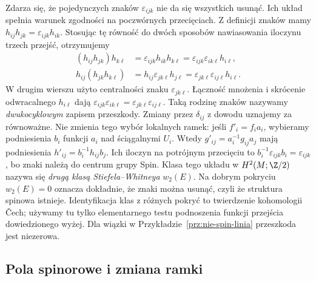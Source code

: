 \begin{uwaga}
Zdarza się, że pojedynczych znaków
$\varepsilon_{ijk}$ nie da się wszystkich
usunąć. Ich układ spełnia warunek zgodności
na poczwórnych przecięciach. Z definicji znaków mamy
$h_{ij}h_{jk}=\varepsilon_{ijk}h_{ik}$.
Stosując tę równość do dwóch sposobów nawiasowania
iloczynu trzech przejść, otrzymujemy
\[
 \begin{aligned}
 (h_{ij}h_{jk})h_{k\ell}
 &=\varepsilon_{ijk}h_{ik}h_{k\ell}
 =\varepsilon_{ijk}\varepsilon_{ik\ell}h_{i\ell},\\
 h_{ij}(h_{jk}h_{k\ell})
 &=h_{ij}\varepsilon_{jk\ell}h_{j\ell}
 =\varepsilon_{jk\ell}\varepsilon_{ij\ell}h_{i\ell}.
 \end{aligned}
\]
W drugim wierszu użyto centralności znaku $\varepsilon_{jk\ell}$.
Łączność mnożenia i skrócenie odwracalnego $h_{i\ell}$
dają $\varepsilon_{ijk}\varepsilon_{ik\ell}
=\varepsilon_{jk\ell}\varepsilon_{ij\ell}$.
Taką rodzinę znaków nazywamy
\emph{dwukocyklowym} zapisem przeszkody.
Zmiany przez $\delta_{ij}$ z dowodu
uznajemy za równoważne. Nie zmienia tego wybór lokalnych ramek:
jeśli $f'_i=f_i a_i$, wybieramy podniesienia $b_i$ funkcji $a_i$
nad ściągalnymi $U_i$. Wtedy $g'_{ij}=a_i^{-1}g_{ij}a_j$
mają podniesienia $h'_{ij}=b_i^{-1}h_{ij}b_j$.
Ich iloczyn na potrójnym przecięciu to
$b_i^{-1}\varepsilon_{ijk}b_i=\varepsilon_{ijk}$,
bo znaki należą do centrum grupy Spin.
Klasa tego układu w
$H^2(M;\Z/2)$ nazywa się
\emph{drugą klasą Stiefela--Whitneya}
$w_2(E)$. Na dobrym pokryciu
$w_2(E)=0$ oznacza dokładnie, że znaki
można usunąć, czyli że struktura spinowa
istnieje. Identyfikacja klas z różnych
pokryć to twierdzenie kohomologii Čech;
używamy tu tylko elementarnego testu
podnoszenia funkcji przejścia dowiedzionego
wyżej. Dla wiązki w
Przykładzie~\ref{prz:nie-spin-linia}
przeszkoda jest niezerowa.
\end{uwaga}

\subsection*{Pola spinorowe i zmiana ramki}
\label{sec:pola-spinorowe-podstawy}

